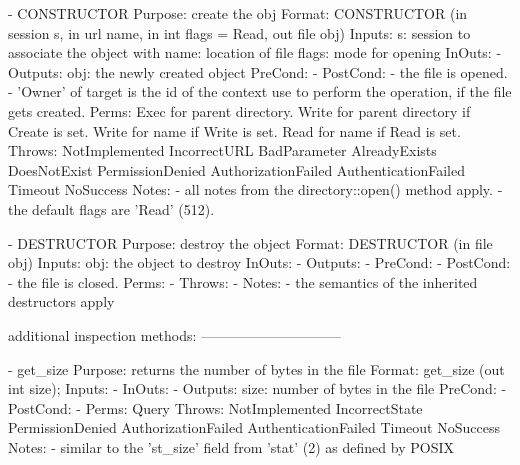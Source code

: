  
 \begin{myspec}
    - CONSTRUCTOR
      Purpose:  create the obj
      Format:   CONSTRUCTOR        (in  session   s,
                                    in  url       name,
                                    in  int       flags = Read,
                                    out file      obj)
      Inputs:   s:                  session to associate the
                                    object with
                name:               location of file
                flags:              mode for opening
      InOuts:   -
      Outputs:  obj:                the newly created object
      PreCond:  -
      PostCond: - the file is opened.
                - 'Owner' of target is the id of the context
                  use to perform the operation, if the file
                  gets created.
      Perms:    Exec  for parent directory.
                Write for parent directory if Create is set.
                Write for name if Write is set.
                Read  for name if Read  is set.
      Throws:   NotImplemented
                IncorrectURL
                BadParameter
                AlreadyExists
                DoesNotExist
                PermissionDenied
                AuthorizationFailed
                AuthenticationFailed
                Timeout
                NoSuccess
      Notes:    - all notes from the directory::open() method
                  apply.
                - the default flags are 'Read' (512).
 
 
    - DESTRUCTOR
      Purpose:  destroy the object
      Format:   DESTRUCTOR         (in  file      obj)
      Inputs:   obj:                the object to destroy
      InOuts:   -
      Outputs:  -
      PreCond:  -
      PostCond: - the file is closed.
      Perms:    - 
      Throws:   - 
      Notes:    - the semantics of the inherited destructors
                  apply
 
 
    additional inspection methods:
    ------------------------------
 
    - get_size
      Purpose:  returns the number of bytes in the file
      Format:   get_size           (out int     size);
      Inputs:   -
      InOuts:   -
      Outputs:  size:               number of bytes in the file
      PreCond:  -
      PostCond: -
      Perms:    Query
      Throws:   NotImplemented
                IncorrectState
                PermissionDenied
                AuthorizationFailed
                AuthenticationFailed
                Timeout
                NoSuccess
      Notes:    - similar to the 'st_size' field from 'stat' (2)
                  as defined by POSIX
 

\end{myspec}
